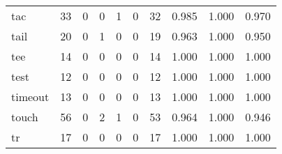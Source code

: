 \begin{longtable}{lp{1.3cm}p{1.3cm}p{1.3cm}p{1.3cm}p{1.3cm}p{1.3cm}p{1.3cm}p{1.3cm}p{1.3cm}}
tac       &                     33 &                                             0 &                                            0 &                                           1 &                                            0 &                                         32 &                                0.985 &                                  1.000 &                                0.970 \\
tail      &                     20 &                                             0 &                                            1 &                                           0 &                                            0 &                                         19 &                                0.963 &                                  1.000 &                                0.950 \\
tee       &                     14 &                                             0 &                                            0 &                                           0 &                                            0 &                                         14 &                                1.000 &                                  1.000 &                                1.000 \\
test      &                     12 &                                             0 &                                            0 &                                           0 &                                            0 &                                         12 &                                1.000 &                                  1.000 &                                1.000 \\
timeout   &                     13 &                                             0 &                                            0 &                                           0 &                                            0 &                                         13 &                                1.000 &                                  1.000 &                                1.000 \\
touch     &                     56 &                                             0 &                                            2 &                                           1 &                                            0 &                                         53 &                                0.964 &                                  1.000 &                                0.946 \\
tr        &                     17 &                                             0 &                                            0 &                                           0 &                                            0 &                                         17 &                                1.000 &                                  1.000 &                                1.000 \\

\end{longtable}
